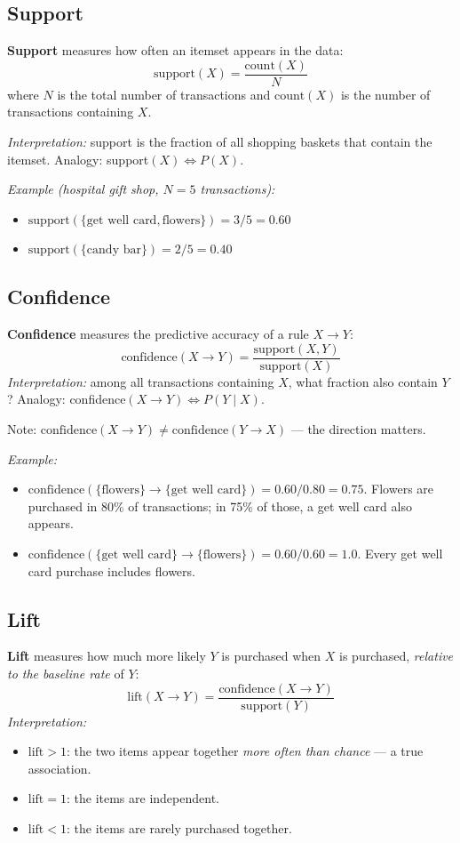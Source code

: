 \documentclass[11pt]{article}
\begin{document}
\subsection{Support}
\textbf{Support} measures how often an itemset appears in the data:
\[
\text{support}(X) = \frac{\text{count}(X)}{N}
\]
where $N$ is the total number of transactions and $\text{count}(X)$ is the
number of transactions containing $X$.

\textit{Interpretation:} support is the fraction of all shopping baskets that
contain the itemset. Analogy: support$(X) \Leftrightarrow P(X)$.

\textit{Example (hospital gift shop, $N=5$ transactions):}
\begin{itemize}
    \item $\text{support}(\{\text{get well card},\text{flowers}\}) = 3/5 = 0.60$
    \item $\text{support}(\{\text{candy bar}\}) = 2/5 = 0.40$
\end{itemize}

\subsection{Confidence}
\textbf{Confidence} measures the predictive accuracy of a rule
$X \to Y$:
\[
\text{confidence}(X \to Y) = \frac{\text{support}(X,Y)}{\text{support}(X)}
\]
\textit{Interpretation:} among all transactions containing $X$, what fraction
also contain $Y$? Analogy: confidence$(X \to Y) \Leftrightarrow P(Y \mid X)$.

Note: $\text{confidence}(X \to Y) \neq \text{confidence}(Y \to X)$ ---
the direction matters.

\textit{Example:}
\begin{itemize}
    \item $\text{confidence}(\{\text{flowers}\} \to \{\text{get well card}\})
      = 0.60/0.80 = 0.75$. Flowers are purchased in 80\% of transactions;
      in 75\% of those, a get well card also appears.
    \item $\text{confidence}(\{\text{get well card}\} \to \{\text{flowers}\})
      = 0.60/0.60 = 1.0$. Every get well card purchase includes flowers.
\end{itemize}

\subsection{Lift}
\textbf{Lift} measures how much more likely $Y$ is purchased when $X$ is
purchased, \emph{relative to the baseline rate} of $Y$:
\[
\text{lift}(X \to Y) = \frac{\text{confidence}(X \to Y)}{\text{support}(Y)}
\]
\textit{Interpretation:}
\begin{itemize}
    \item $\text{lift} > 1$: the two items appear together \emph{more often
      than chance} --- a true association.
    \item $\text{lift} = 1$: the items are independent.
    \item $\text{lift} < 1$: the items are rarely purchased together.
\end{itemize}
\end{document}
